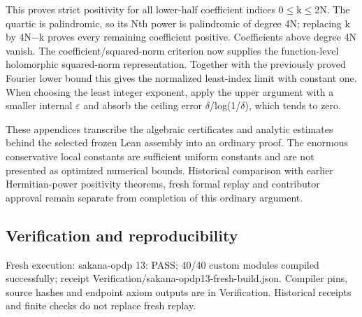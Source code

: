 \documentclass[11pt,a4paper]{article}
\begin{document}
This proves strict positivity for all lower-half coefficient indices 0\ensuremath{\leq}k\ensuremath{\leq}2N. The quartic is palindromic, so its Nth power is palindromic of degree 4N; replacing k by 4N\ensuremath{-}k proves every remaining coefficient positive. Coefficients above degree 4N vanish. The coefficient/squared-norm criterion now supplies the function-level holomorphic squared-norm representation. Together with the previously proved Fourier lower bound this gives the normalized least-index limit with constant one. When choosing the least integer exponent, apply the upper argument with a smaller internal \ensuremath{\varepsilon} and absorb the ceiling error \ensuremath{\delta}/log(1/\ensuremath{\delta}), which tends to zero.

These appendices transcribe the algebraic certificates and analytic estimates behind the selected frozen Lean assembly into an ordinary proof. The enormous conservative local constants are sufficient uniform constants and are not presented as optimized numerical bounds. Historical comparison with earlier Hermitian-power positivity theorems, fresh formal replay and contributor approval remain separate from completion of this ordinary argument.

\subsection{Verification and reproducibility}
Fresh execution: sakana-opdp 13: PASS; 40/40 custom modules compiled successfully; receipt Verification/sakana-opdp13-fresh-build.json. Compiler pins, source hashes and endpoint axiom outputs are in Verification. Historical receipts and finite checks do not replace fresh replay.
\end{document}
